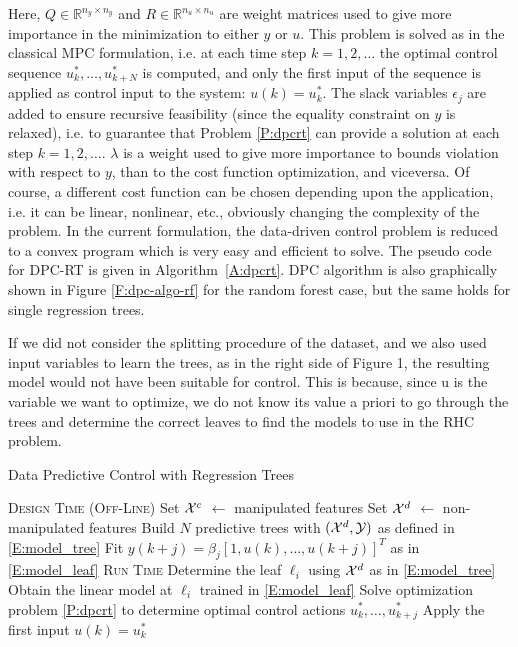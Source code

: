 \textcolor[rgb]{0,0,1}{Here, $Q \in \mathbb{R}^{n_y\times n_y}$ and $R \in \mathbb{R}^{n_u\times n_u}$ are weight matrices used to give more importance in the minimization to either $y$ or $u$.
This problem is solved as in the classical MPC formulation, i.e. at each time step $k=1,2,\ldots$ the optimal control sequence $u^*_k,\ldots,u^*_{k+N}$ is computed, and only the first input of the sequence is applied as control input to the system: $u(k) = u^*_k$.
The slack variables $\epsilon_j$ are added to ensure recursive feasibility (since the equality constraint on $y$ is relaxed), i.e. to guarantee that Problem \ref{P:dpcrt} can provide a solution at each step $k=1,2,\ldots$.
$\lambda$ is a weight used to give more importance to bounds violation with respect to $y$, than to the cost function optimization, and viceversa. 
Of course, a different cost function can be chosen depending upon the application, i.e. it can be linear, nonlinear, etc., obviously changing the complexity of the problem.
In the current formulation, the data-driven control problem is reduced to a convex program which is very easy and efficient to solve.}
The pseudo code for DPC-RT is given in Algorithm~\ref{A:dpcrt}.
\textcolor[rgb]{0,0,1}{DPC algorithm is also graphically shown in Figure \ref{F:dpc-algo-rf} for the random forest case, but the same holds for single regression trees.}

\textcolor[rgb]{0,0,1}{\begin{remark}
	 If we did not consider the splitting procedure	of the dataset, and we also used input variables to learn the trees, as in the right side of Figure 1, the resulting
	 model would not have been suitable for control. This is because, since u is the variable we want to optimize, we do not know its value a priori to go through the trees and determine the correct leaves to find the models to use in the RHC problem.
\end{remark}}

\begin{algorithm}[t!]
	\caption{Data Predictive Control with Regression Trees}
	\label{A:dpcrt}
	\begin{algorithmic}[1]
		\State \textsc{Design Time (Off-Line)}
		\State Set $\mathcal{X}^c$ $\gets$ manipulated features
		\State Set $\mathcal{X}^d$ $\gets$ non-manipulated features
		\State Build $N$ predictive trees with $(\mathcal{X}^d,\mathcal{Y})$ as defined in \eqref{E:model_tree}
		\State Fit $ y(k+j) =  \beta_j \left[1,u(k),\ldots,u(k+j) \right]^T$ as in \eqref{E:model_leaf}
		\EndFor
		\EndFor
		\EndProcedure
		\State \textsc{Run Time}
		\State Determine the leaf $\ell_i$ using $\mathcal{X}^d$ as in \eqref{E:model_tree}
		\State Obtain the linear model at $\ell_i$ trained in \eqref{E:model_leaf}
		\EndFor
		\State Solve optimization problem \ref{P:dpcrt} to determine optimal
		\State control actions $u^*_k,\ldots,u^*_{k+j}$
		\State Apply the first input $u(k)=u^*_k$
		\EndWhile
		\EndProcedure
	\end{algorithmic}
\end{algorithm}


